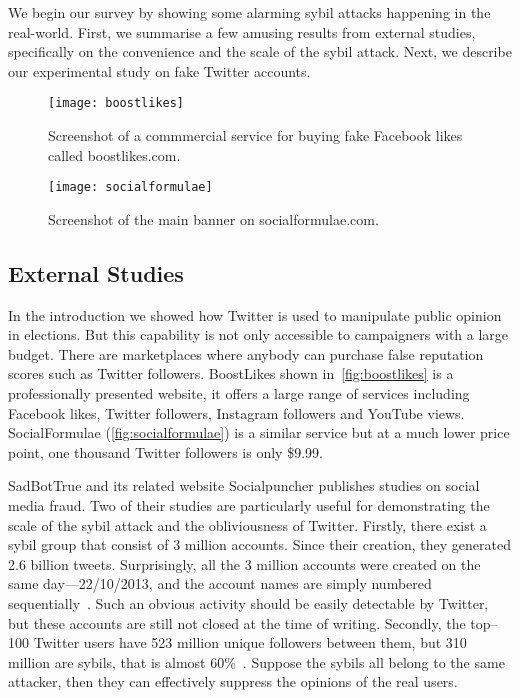 We begin our survey by showing some alarming sybil attacks happening in the
real-world. First, we summarise a few amusing results from external studies,
specifically on the convenience and the scale of the sybil attack. Next, we
describe our experimental study on fake Twitter accounts.

\begin{figure}
  \centering
  \texttt{[image: boostlikes]}
  \caption{Screenshot of a commmercial service for buying fake Facebook likes
    called boostlikes.com.}
  \label{fig:boostlikes}
\end{figure}

\begin{figure*}
  \centering
  \texttt{[image: socialformulae]}
  \caption{Screenshot of the main banner on socialformulae.com.}
  \label{fig:socialformulae}
\end{figure*}

\subsection{External Studies}
\label{sec:external-studies}

In the introduction we showed how Twitter is used to manipulate public opinion
in elections. But this capability is not only accessible to campaigners with a
large budget. There are marketplaces where anybody can purchase false reputation
scores such as Twitter followers. BoostLikes shown in~\autoref{fig:boostlikes}
is a professionally presented website, it offers a large range of services
including Facebook likes, Twitter followers, Instagram followers and YouTube
views. SocialFormulae (\autoref{fig:socialformulae}) is a similar service but at
a much lower price point, one thousand Twitter followers is only \$9.99. 

SadBotTrue and its related website Socialpuncher publishes studies on social
media fraud. Two of their studies are particularly useful for demonstrating the
scale of the sybil attack and the obliviousness of Twitter. Firstly, there exist
a sybil group that consist of 3 million accounts. Since their creation, they
generated 2.6 billion tweets. Surprisingly, all the 3 million accounts were
created on the same day---22/10/2013, and the account names are simply numbered
sequentially~\cite{sadbottrue}. Such an obvious activity should be easily
detectable by Twitter, but these accounts are still not closed at the time of
writing. Secondly, the top--100 Twitter users have 523 million unique followers
between them, but 310 million are sybils, that is almost
60\%~\cite{socialpuncher}. Suppose the sybils all belong to the same attacker,
then they can effectively suppress the opinions of the real users.


